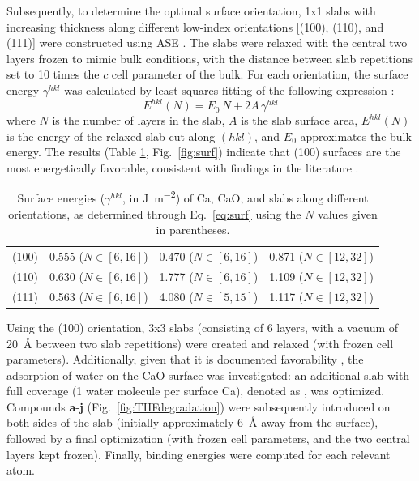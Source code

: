 \documentclass[12pt,a4paper]{article}
\begin{document}
Subsequently, to determine the optimal surface orientation, 1x1 slabs with increasing thickness along different low-index orientations [(100), (110), and (111)] were constructed using ASE \cite{larsenAtomicSimulationEnvironment2017}. The slabs were relaxed with the central two layers frozen to mimic bulk conditions, with the distance between slab repetitions set to 10 times the $c$ cell parameter of the bulk. For each orientation, the surface energy $\gamma^{hkl}$ was calculated by least-squares fitting of the following expression \cite{sunEfficientCreationConvergence2013,tranSurfaceEnergiesElemental2016}:
\begin{equation}
	E^{hkl}(N) = E_0\,N + 2A\,\gamma^{hkl} \label{eq:surf}
\end{equation}
where $N$ is the number of layers in the slab, $A$ is the slab surface area, $E^{hkl}(N)$ is the energy of the relaxed slab cut along $(hkl)$, and $E_0$ approximates the bulk energy. The results (Table \ref{tab:surf}, Fig.~\ref{fig:surf}) indicate that (100) surfaces are the most energetically favorable, consistent with findings in the literature \cite{deleeuwDensityFunctionalTheory2000,ebadiInsightsLiMetalOrganic2019}.

\begin{table}[!h]
	\centering
	\begin{tabular}{lccc}
		\toprule
		&	\ce{Ca} & \ce{CaO} &	\ce{CaH2} \\
		\midrule
		(100) & 0.555 ($N\in[6,16]$) & 0.470 ($N\in[6,16]$) & 0.871  ($N\in[12,32]$)\\
		(110) & 0.630  ($N\in[6,16]$)& 1.777  ($N\in[6,16]$)& 1.109 ($N\in[12,32]$)\\
		(111) & 0.563  ($N\in[6,16]$) & 4.080  ($N\in[5,15]$)  & 1.117   ($N\in[12,32]$) \\ 
		\bottomrule
	\end{tabular}
	\caption{Surface energies ($\gamma^{hkl}$, in \si{\joule\per\meter\squared}) of Ca, CaO, and  slabs along different orientations, as determined through Eq.~\eqref{eq:surf} using the $N$ values given in parentheses.}
	\label{tab:surf}
\end{table}

Using the (100) orientation, 3x3 slabs (consisting of 6 layers, with a vacuum of \SI{20}{\angstrom} between two slab repetitions) were created and relaxed (with frozen cell parameters). Additionally, given that it is documented favorability \cite{deleeuwDensityFunctionalTheory2000,fujimoriInteractionWaterCaO2016a}, the adsorption of water on the CaO surface was investigated: an additional slab with full coverage (1 water molecule per surface Ca), denoted as , was optimized. Compounds \textbf{a}-\textbf{j} (Fig.~\ref{fig:THFdegradation}) were subsequently introduced on both sides of the slab (initially approximately \SI{6}{\angstrom} away from the surface), followed by a final optimization (with frozen cell parameters, and the two central layers kept frozen). Finally, binding energies were computed for each relevant atom.
\end{document}
